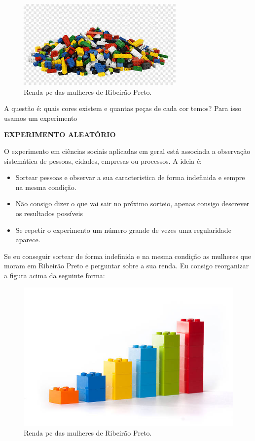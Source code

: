 \documentclass[
  letterpaper,
  DIV=11,
  numbers=noendperiod]{scrreprt}
\providecommand{\tightlist}{%
  \setlength{\itemsep}{0pt}\setlength{\parskip}{0pt}}
\begin{document}
\begin{figure}[H]

{\centering \includegraphics[width=0.5\linewidth,height=\textheight,keepaspectratio]{figuras/lego.jpg}

}

\caption{Renda pc das mulheres de Ribeirão Preto.}

\end{figure}%

A questão é: quais cores existem e quantas peças de cada cor temos? Para
isso usamos um experimento

\textbf{EXPERIMENTO ALEATÓRIO}

O experimento em ciências sociais aplicadas em geral está associada a
observação sistemática de pessoas, cidades, empresas ou processos. A
ideia é:

\begin{itemize}
\tightlist
\item
  Sortear pessoas e observar a sua caracteristica de forma indefinida e
  sempre na mesma condição.\\
\item
  Não consigo dizer o que vai sair no próximo sorteio, apenas consigo
  descrever os resultados possíveis
\item
  Se repetir o experimento um número grande de vezes uma regularidade
  aparece.
\end{itemize}

Se eu conseguir sortear de forma indefinida e na mesma condição as
mulheres que moram em Ribeirão Preto e perguntar sobre a sua renda. Eu
consigo reorganizar a figura acima da seguinte forma:

\begin{figure}[H]

{\centering \includegraphics[width=0.5\linewidth,height=\textheight,keepaspectratio]{figuras/lego_org.jpg}

}

\caption{Renda pc das mulheres de Ribeirão Preto.}

\end{figure}%
\end{document}
